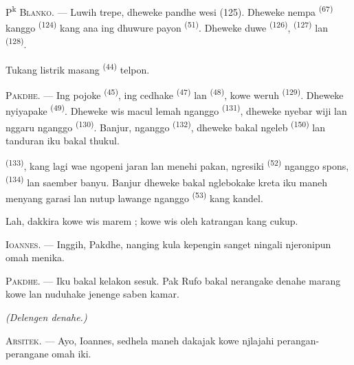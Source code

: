 P\textsuperscript{k} \textsc{Blanko}. --- Luwih trepe, dheweke pandhe
wesi (125). Dheweke nempa  \textsuperscript{(67)}
kanggo  \textsuperscript{(124)} kang ana ing
dhuwure payon  \textsuperscript{(51)}. Dheweke duwe
 \textsuperscript{(126)}, 
\textsuperscript{(127)} lan  \textsuperscript{(128)}.

Tukang listrik masang  
\textsuperscript{(44)} telpon.

\VUsaut{3.0mm}

\textsc{Pakdhe}. --- Ing pojoke  \textsuperscript{(45)},
ing cedhake  \textsuperscript{(47)} lan
 \textsuperscript{(48)}, kowe weruh  \textsuperscript{(129)}. Dheweke nyiyapake 
\textsuperscript{(49)}. Dheweke wis macul lemah nganggo 
\textsuperscript{(131)}, dheweke nyebar wiji lan nggaru nganggo
 \textsuperscript{(130)}. Banjur, nganggo 
\textsuperscript{(132)}, dheweke bakal ngeleb 
\textsuperscript{(150)} lan tanduran iku bakal thukul.

 \textsuperscript{(133)}, kang lagi wae ngopeni
jaran lan menehi pakan, ngresiki  \textsuperscript{(52)}
nganggo spons,  \textsuperscript{(134)} lan
saember banyu. Banjur dheweke bakal nglebokake kreta iku maneh menyang
garasi lan nutup lawange nganggo  \textsuperscript{(53)}
kang kandel.

Lah, dakkira kowe wis marem ; kowe wis oleh katrangan kang cukup.

\textsc{Ioannes}. --- Inggih, Pakdhe, nanging kula kepengin sanget
ningali njeronipun omah menika.

\textsc{Pakdhe}. --- Iku bakal kelakon sesuk. Pak Rufo bakal
nerangake denahe marang kowe lan nuduhake jenenge saben kamar.

\VUsaut{3.0mm}
\VUsaut{2.4mm}

{\centering\textit{(Delengen denahe.)}\par}
\VUsaut{2.4mm}

\textsc{Arsitek}. --- Ayo, Ioannes, sedhela maneh dakajak kowe
njlajahi perangan-perangane omah iki.

